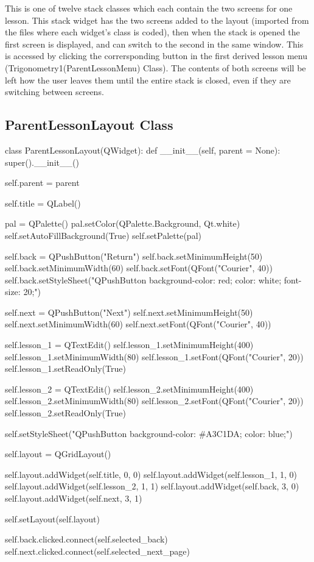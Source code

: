 This is one of twelve stack classes which each contain the two screens for one lesson. This stack widget has the two screens added to the layout (imported from the files where each widget's class is coded), then when the stack is opened the first screen is displayed, and can switch to the second in the same window. This is accessed by clicking the corrersponding button in the first derived lesson menu (Trigonometry1(ParentLessonMenu) Class). The contents of both screens will be left how the user leaves them until the entire stack is closed, even if they are switching between screens.

\subsection{ParentLessonLayout Class}

\begin{python}
class ParentLessonLayout(QWidget):
    def __init__(self, parent = None):
        super().__init__()
   
        self.parent = parent

        self.title = QLabel()

        pal = QPalette()
        pal.setColor(QPalette.Background, Qt.white)
        self.setAutoFillBackground(True)
        self.setPalette(pal)

        self.back = QPushButton("Return")
        self.back.setMinimumHeight(50)
        self.back.setMinimumWidth(60)
        self.back.setFont(QFont("Courier", 40))
        self.back.setStyleSheet("QPushButton {background-color: red; color: white; font-size: 20;}")
        
        self.next = QPushButton("Next")
        self.next.setMinimumHeight(50)
        self.next.setMinimumWidth(60)
        self.next.setFont(QFont("Courier", 40))

        self.lesson_1 = QTextEdit()
        self.lesson_1.setMinimumHeight(400)
        self.lesson_1.setMinimumWidth(80)
        self.lesson_1.setFont(QFont("Courier", 20))
        self.lesson_1.setReadOnly(True)
        
        self.lesson_2 = QTextEdit()
        self.lesson_2.setMinimumHeight(400)
        self.lesson_2.setMinimumWidth(80)
        self.lesson_2.setFont(QFont("Courier", 20))
        self.lesson_2.setReadOnly(True)

        self.setStyleSheet("QPushButton {background-color: #A3C1DA; color: blue;}")

        self.layout = QGridLayout()

        self.layout.addWidget(self.title, 0, 0) 
        self.layout.addWidget(self.lesson_1, 1, 0)
        self.layout.addWidget(self.lesson_2, 1, 1)
        self.layout.addWidget(self.back, 3, 0)
        self.layout.addWidget(self.next, 3, 1)

        self.setLayout(self.layout)

        self.back.clicked.connect(self.selected_back)
        self.next.clicked.connect(self.selected_next_page)
\end{python}

